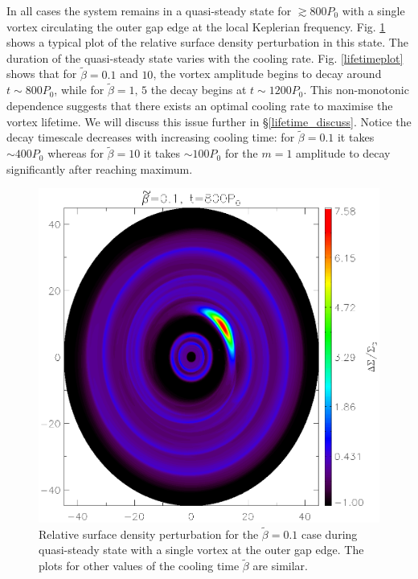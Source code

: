 In all cases the system remains in a quasi-steady state for
$\gtrsim800P_0$ with a single vortex circulating the outer gap edge at
the local Keplerian frequency. Fig. \ref{Vortex2D} shows a typical
plot of the relative surface density perturbation in this state.    
The duration of the quasi-steady state varies with the cooling
rate. Fig. \ref{lifetimeplot} shows that for $\tilde{\beta}=0.1$ and
$10$, the vortex amplitude begins to decay around 
$t\sim800P_0$, while for $\tilde{\beta}=1,\,5$ the decay begins at 
$t\sim1200P_0$. This non-monotonic dependence suggests that there
exists an optimal cooling rate to maximise the vortex lifetime. We
will discuss this issue further in 
\S\ref{lifetime_discuss}. Notice the decay timescale decreases with
increasing cooling time: for $\tilde{\beta}=0.1$ it takes $\sim400P_0$
whereas for $\tilde{\beta}=10$ it takes $\sim 100P_0$ for the $m=1$
amplitude to decay significantly after reaching maximum. 



\begin{figure}
  \includegraphics[width=\linewidth,height=\linewidth]{figures/vortex2D}
  \caption{Relative surface density perturbation for the
    $\tilde\beta=0.1$ case during quasi-steady state with a single
    vortex at the outer gap edge. 
    The plots for other values of the cooling time
    $\tilde{\beta}$ are similar.
    \label{Vortex2D}} 
\end{figure}

